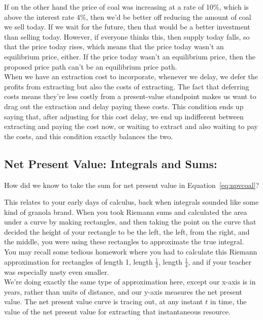 \begin{appendices}
\begin{subappendices}
    If on the other hand the price of coal was increasing at a rate of 10\%, which is above the interest rate 4\%, then we'd be better off reducing the amount of coal we sell today. If we wait for the future, then that would be a better investment than selling today. However, if everyone thinks this, then supply today falls, so that the price today rises, which means that the price today wasn't an equilibrium price, either. If the price today wasn't an equilibrium price, then the proposed price path can't be an equilibrium price path.\\
    
    When we have an extraction cost to incorporate, whenever we delay, we defer the profits from extracting but also the costs of extracting. The fact that deferring costs means they're less costly from a present-value standpoint makes us want to drag out the extraction and delay paying these costs. This condition ends up saying that, after adjusting for this cost delay, we end up indifferent between extracting and paying the cost now, or waiting to extract and also waiting to pay the costs, and this condition exactly balances the two.
    
    
\subsection{Net Present Value: Integrals and Sums:}\label{sec:npvintegrals}


    How did we know to take the sum for net present value in Equation~\eqref{eq:npvcoal}?
    
    This relates to your early days of calculus, back when integrals sounded like some kind of granola brand. When you took Riemann sums and calculated the area under a curve by making rectangles, and then taking the point on the curve that decided the height of your rectangle to be the left, the left, from the right, and the middle, you were using these rectangles to approximate the true integral.\\
    
    You may recall some tedious homework where you had to calculate this Riemann approximation for rectangles of length 1, length $\frac{1}{2}$, length $\frac{1}{4}$, and if your teacher was especially nasty even smaller.\\
    
    We're doing exactly the same type of approximation here, except our x-axis is in years, rather than units of distance, and our y-axis measures the net present value. The net present value curve is tracing out, at any instant $t$ in time, the value of the net present value for extracting that instantaneous resource.
    

\end{subappendices}
\end{appendices}
